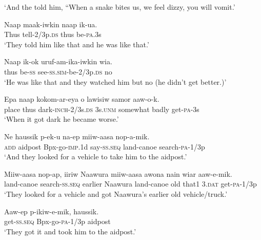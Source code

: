 {\glt ‘And the told him, “When a snake bites us, we feel dizzy, you will vomit.’ \\
\z


\ea\label{ex:a:x21}
\gll  Naap  maak-iwkin  naap  ik-ua. \\
Thus  tell-2/3p.\textsc{ds}  thus  be-\textsc{pa}.3s \\
\glt ‘They told him like that and he was like that.’ \\
\z


\ea\label{ex:a:x22}
\gll  Naap  ik-ok  uruf-am-ika-iwkin  wia. \\
thus  be-\textsc{ss}  see-\textsc{ss}.\textsc{sim}-be-2/3p.\textsc{ds}  no \\
\glt ‘He was like that and they watched him but no (he didn’t get better.)’ \\
\z


\ea\label{ex:a:x23}
\gll  Epa  naap  kokom-ar-eya  o  lawisiw  samor         aaw-o-k. \\
place  thus  dark-\textsc{inch}-2/3s.\textsc{ds}  3s.\textsc{unm}  somewhat  badly  get-\textsc{pa}-3s \\


\glt ‘When it got dark he became worse.’ \\
\z


\ea\label{ex:a:x24}
\gll  Ne  haussik  p-ek-u  na-ep  miiw-aasa  nop-a-mik. \\
\textsc{add}  aidpost  Bpx-go-\textsc{imp}.1d  say-\textsc{ss.seq}  land-canoe  search-\textsc{pa}-1/3p \\
\glt ‘And they looked for a vehicle to take him to the aidpost.’ \\
\z


\ea\label{ex:a:x25}
\gll  Miiw-aasa  nop-ap,  iiriw  Naawura  miiw-aasa  awona  nain     wiar  aaw-e-mik. \\
land-canoe  search-\textsc{ss.seq}  earlier  Naawura  land-canoe  old  that1  3.\textsc{dat}  get-\textsc{pa}-1/3p \\


\glt ‘They looked for a vehicle and got Naawura’s earlier old vehicle/truck.’ \\
\z


\ea\label{ex:a:x26}
\gll  Aaw-ep  p-ikiw-e-mik,  haussik. \\
get-\textsc{ss.seq}  Bpx-go-\textsc{pa}-1/3p  aidpost \\
\glt ‘They got it and took him to the aidpost.’ \\
\z


}
